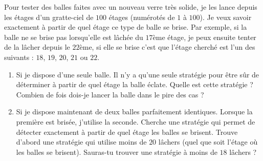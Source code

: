 \documentclass[class=report,crop=false, 12pt]{standalone}
\begin{document}
\begin{activite}

Pour tester des balles faites avec un nouveau verre très solide, je les lance depuis les étages d'un gratte-ciel de $100$ étages (numérotés de $1$ à $100$). Je veux savoir exactement à partir de quel étage ce type de balle se brise. Par exemple, si la balle ne se brise pas lorsqu'elle est lâchée du $17$ème étage, je peux ensuite tenter de la lâcher depuis le $22$ème, si elle se brise c'est que 
l'étage cherché est l'un des suivants : $18$, $19$, $20$, $21$ ou $22$.
 
\begin{enumerate}
  \item Si je dispose d'une seule balle. Il n'y a qu'une seule stratégie pour être sûr de déterminer à partir de quel étage la balle éclate. Quelle est cette stratégie ? Combien de fois dois-je lancer la balle dans le pire des cas ?

  \item Si je dispose maintenant de deux balles parfaitement identiques. Lorsque la première est brisée, j'utilise la seconde. Cherche une stratégie qui permet de détecter exactement à partir de quel étage les balles se brisent.
Trouve d'abord une stratégie qui utilise moins de $20$ lâchers (quel que soit l'étage où les balles se brisent).
Sauras-tu trouver une stratégie à moins de $18$ lâchers ?  
\end{enumerate}

\end{activite}
\end{document}

